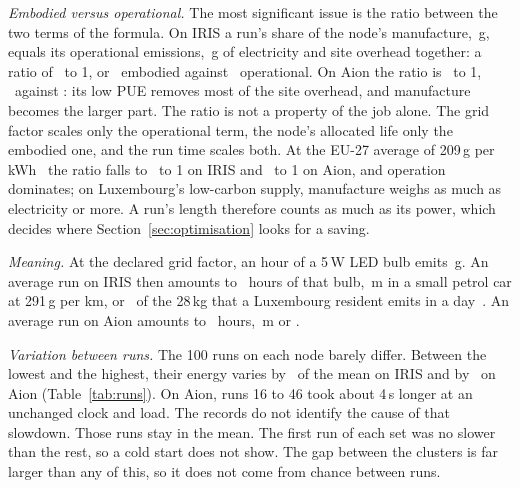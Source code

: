\documentclass[conference,a4paper]{IEEEtran}
\begin{document}
\emph{Embodied versus operational.} The most significant issue is the ratio
between the two terms of the formula. On IRIS a run's share of the node's
manufacture, \IrisGEmb\,g, equals its operational emissions, \IrisGOp\,g of
electricity and site overhead together: a ratio of \IrisEmbOpRatio\ to 1, or
\IrisShareEmb\ embodied against \IrisShareOp\ operational. On Aion the ratio is
\AionEmbOpRatio\ to 1, \AionShareEmb\ against \AionShareOp: its low PUE removes
most of the site overhead, and manufacture becomes the larger part. The ratio is
not a property of the job alone. The grid factor scales only the operational
term, the node's allocated life only the embodied one, and the run time scales
both. At the EU-27 average of 209\,g per kWh~\cite{ries2026s2} the ratio falls
to \IrisEmbOpRatioEU\ to 1 on IRIS and \AionEmbOpRatioEU\ to 1 on Aion, and
operation dominates; on Luxembourg's low-carbon supply, manufacture weighs as
much as electricity or more. A run's length therefore counts as much as its
power, which decides where Section~\ref{sec:optimisation} looks for a saving.

\emph{Meaning.} At the declared grid factor, an hour of a 5\,W LED bulb emits
\LedGrams\,g. An average run on IRIS then amounts to \IrisLedHours\ hours of that bulb,
\IrisCarMetres\,m in a small petrol car at 291\,g per km, or \IrisResidentShare\
of the 28\,kg that a Luxembourg resident emits in a day~\cite{ries2026s2}. An
average run on Aion amounts to \AionLedHours\ hours, \AionCarMetres\,m or
\AionResidentShare.

\emph{Variation between runs.} The 100 runs on each node barely differ. Between
the lowest and the highest, their energy varies by \IrisWithinNodeSpread\ of the
mean on IRIS and by \AionWithinNodeSpread\ on Aion (Table~\ref{tab:runs}). On
Aion, runs 16 to 46 took about 4\,s longer at an unchanged clock and load.
The records do not identify the cause of that slowdown. Those runs stay
in the mean. The first run of each set was no
slower than the rest, so a cold start does not show. The gap between the
clusters is far larger than any of this, so it does not come from chance between
runs.
\end{document}
